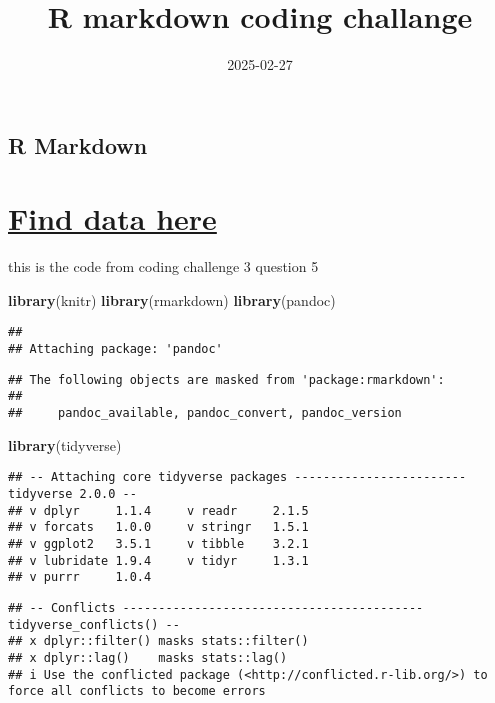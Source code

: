 \documentclass[
]{article}
\title{R markdown coding challange}
\author{}
\date{\vspace{-2.5em}2025-02-27}
\newenvironment{Shaded}{\begin{snugshade}}{\end{snugshade}}
\newcommand{\FunctionTok}[1]{\textcolor[rgb]{0.13,0.29,0.53}{\textbf{#1}}}
\newcommand{\NormalTok}[1]{#1}
\begin{document}
\maketitle

{
\setcounter{tocdepth}{2}
\tableofcontents
}
\subsection{R Markdown}\label{r-markdown}

\section{\texorpdfstring{\href{https://doi.org/10.1094/PDIS-06-21-1253-RE}{Find
data here}}{Find data here}}\label{find-data-here}

this is the code from coding challenge 3 question 5

\begin{Shaded}
\begin{Highlighting}[]
\FunctionTok{library}\NormalTok{(knitr)}
\FunctionTok{library}\NormalTok{(rmarkdown)}
\FunctionTok{library}\NormalTok{(pandoc)}
\end{Highlighting}
\end{Shaded}

\begin{verbatim}
## 
## Attaching package: 'pandoc'
\end{verbatim}

\begin{verbatim}
## The following objects are masked from 'package:rmarkdown':
## 
##     pandoc_available, pandoc_convert, pandoc_version
\end{verbatim}

\begin{Shaded}
\begin{Highlighting}[]
\FunctionTok{library}\NormalTok{(tidyverse)}
\end{Highlighting}
\end{Shaded}

\begin{verbatim}
## -- Attaching core tidyverse packages ------------------------ tidyverse 2.0.0 --
## v dplyr     1.1.4     v readr     2.1.5
## v forcats   1.0.0     v stringr   1.5.1
## v ggplot2   3.5.1     v tibble    3.2.1
## v lubridate 1.9.4     v tidyr     1.3.1
## v purrr     1.0.4
\end{verbatim}

\begin{verbatim}
## -- Conflicts ------------------------------------------ tidyverse_conflicts() --
## x dplyr::filter() masks stats::filter()
## x dplyr::lag()    masks stats::lag()
## i Use the conflicted package (<http://conflicted.r-lib.org/>) to force all conflicts to become errors
\end{verbatim}
\end{document}
